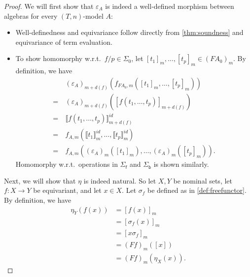 \documentclass[a4paper,UKenglish,cleveref,thm-restate,numberwithinsect,final]{lipics-v2021}
\newcommand{\sigp}{\Sigma_0}
\newcommand{\sigf}{\Sigma_{\mathsf f}}
\newcommand{\sigb}{\Sigma_{\mathsf b}}
\theoremstyle{plain}
\newcommand{\id}{\mathit{id}}
\numberwithin{equation}{section}
\newcommand{\+}[1]{\mathcal{#1}\xspace}
\theoremstyle{definition}
\begin{document}
\begin{proof}
    We will first show that \(\varepsilon_A\) is indeed a well-defined morphism between algebras for every $(T,n)$-model \(A\):
    \begin{itemize}
        \item
            Well-definedness and equivariance follow directly from \cref{thm:soundness} and equivariance of term evaluation.
        \item
            To show homomorphy w.r.t.~\(f/p \in \sigp\), let \([t_1]_m, \ldots, [t_p]_m \in (FA_0)_m\).
            By definition, we have
            \begin{align*}
                &(\varepsilon_A)_{m + d(f)}(f_{FA_0, m}([t_1]_m, \ldots, [t_p]_m)) \\
                =~&(\varepsilon_A)_{m + d(f)}([f(t_1, \ldots, t_p)]_{m + d(f)}) \\
                =~&\llbracket f(t_1, \ldots, t_p) \rrbracket^{\id}_{m + d(f)} \\
                =~&f_{A, m}(\llbracket t_1 \rrbracket^{\id}_m, \ldots, \llbracket t_p \rrbracket^{\id}_m) \\
                =~&f_{A, m}((\varepsilon_A)_m([t_1]_m), \ldots, (\varepsilon_A)_m([t_p]_m)).
            \end{align*}
            Homomorphy w.r.t.~operations in $\sigf$ and $\sigb$ is shown similarly.
    \end{itemize}

    Next, we will show that \(\eta\) is indeed natural.  So let
    \(X, Y\) be nominal sets, let $f\colon X\to Y$ be equivariant, and
    let \(x \in X\).  Let \(\sigma_f\) be defined as in
    \cref{def:freefunctor}.  By definition, we have
    \begin{align*}
        \eta_Y(f(x))
        &= [f(x)]_m \\
        &= [\sigma_f(x)]_m \\
        &= [x\sigma_f]_m \\
        &= (Ff)_m([x]) \\
        &= (Ff)_m(\eta_X(x)).
    \end{align*}


\end{proof}
\end{document}
